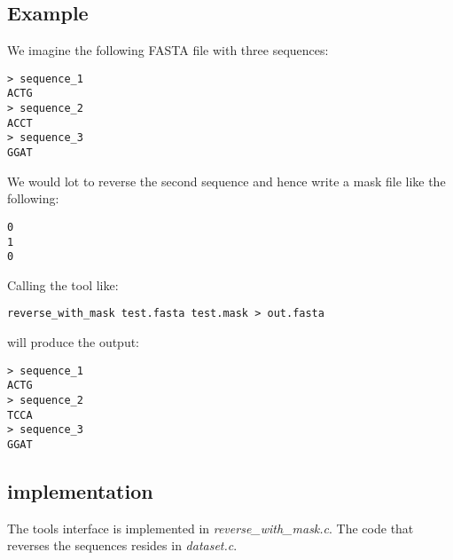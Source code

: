 \subsection{Example}
We imagine the following FASTA file with three sequences:
\begin{lstlisting}
> sequence_1
ACTG
> sequence_2
ACCT
> sequence_3
GGAT
\end{lstlisting}
We would lot to reverse the second sequence and hence write a mask file
like the following:
\begin{lstlisting}
0
1
0
\end{lstlisting}
Calling the tool like:
\begin{lstlisting}
reverse_with_mask test.fasta test.mask > out.fasta
\end{lstlisting}
will produce the output:
\begin{lstlisting}
> sequence_1
ACTG
> sequence_2
TCCA
> sequence_3
GGAT
\end{lstlisting}

\subsection{implementation}
The tools interface is implemented in \emph{reverse\_with\_mask.c}.
The code that reverses the sequences resides in \emph{dataset.c}.
